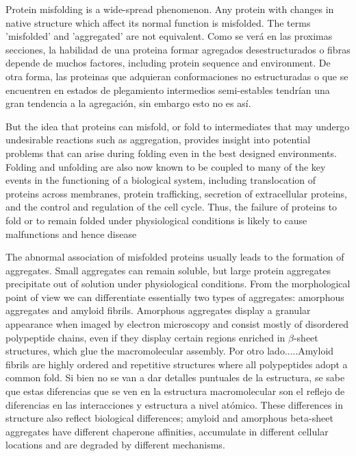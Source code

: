 Protein misfolding is a wide-spread phenomenon. Any protein with changes in native structure which affect its normal function is misfolded. 
The terms 'misfolded' and 'aggregated' are not equivalent. Como se verá en las proximas secciones, la habilidad de una proteina formar agregados desestructurados o fibras depende de muchos factores, including protein sequence and environment.
De otra forma, las proteinas que adquieran conformaciones no estructuradas o que se encuentren en estados de plegamiento intermedios semi-estables tendrían una gran tendencia a la agregación, sin embargo esto no es así. 

But the idea that proteins can misfold, or fold to intermediates that may undergo undesirable reactions such as aggregation, provides insight into potential problems that can arise during folding even in the best designed environments.
Folding and unfolding are also now known to be coupled to many of the key events in the functioning of a biological system, including translocation of proteins across membranes, protein trafficking, 
secretion of extracellular proteins, and the control and regulation of the cell cycle.
Thus, the failure of proteins to fold or to remain folded under physiological conditions is likely to cause malfunctions and hence disease








The abnormal association of misfolded proteins usually leads to the formation of aggregates. 
Small aggregates can remain soluble, but large protein aggregates precipitate out of solution under physiological conditions. 
From the morphological point of view we can differentiate essentially two types of aggregates: amorphous aggregates and amyloid fibrils. 
Amorphous aggregates display a granular appearance when imaged by electron microscopy and consist mostly of disordered polypeptide chains, even if they
display certain regions enriched in $\beta$-sheet structures, which glue the macromolecular assembly.
Por otro lado.....Amyloid fibrils are highly ordered and repetitive structures where all polypeptides adopt a common fold.
Si bien no se van a dar detalles puntuales de la estructura, se sabe que estas diferencias que se ven en la estructura macromolecular son el reflejo de diferencias en las interacciones y estructura a nivel atómico.
These differences in structure also reflect biological differences; amyloid and amorphous beta-sheet aggregates have different chaperone affinities, accumulate in different cellular locations and are degraded by different mechanisms.

